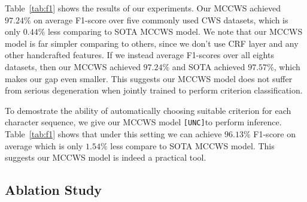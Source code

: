 \documentclass[11pt]{article}
\newcommand{\UNC}{\texttt{[UNC]}}
\begin{document}
Table~\ref{tab:f1} shows the results of our experiments.
Our MCCWS achieved \(97.24\%\) on average F1-score over five commonly used CWS datasets, which is only \(0.44\%\) less comparing to SOTA MCCWS model.
We note that our MCCWS model is far simpler comparing to others, since we don't use CRF layer and any other handcrafted features.
If we instead average F1-scores over all eights datasets, then our MCCWS achieved \(97.24\%\) and SOTA achieved \(97.57\%\), which makes our gap even smaller.
This suggests our MCCWS model does not suffer from serious degeneration when jointly trained to perform criterion classification.

To demostrate the ability of automatically choosing suitable criterion for each character sequence, we give our MCCWS model \UNC to perform inference.
Table~\ref{tab:f1} shows that under this setting we can achieve \(96.13\%\) F1-score on average which is only \(1.54\%\) less compare to SOTA MCCWS model.
This suggests our MCCWS model is indeed a practical tool.

\subsection{Ablation Study}



\end{document}
